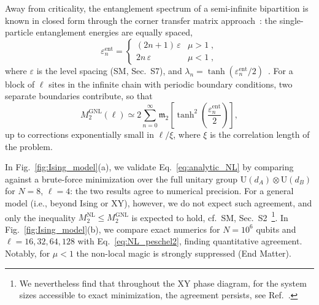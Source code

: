 \documentclass[aps,prl,twocolumn,superscriptaddress,reprint,longbibliography,nofootinbib]{revtex4-2}
\begin{document}
Away from criticality, the entanglement spectrum of a semi-infinite bipartition is known in closed form through the corner transfer matrix approach~\cite{Peschel2009,Eisler2017}: the single-particle entanglement energies are equally spaced,
\begin{equation}
    \varepsilon_n^{\mathrm{ent}} = \begin{cases}
        (2n+1)\,\varepsilon & \mu > 1 \;,\\
        2n\,\varepsilon & \mu < 1 \;,
    \end{cases}
    \label{eq:peschel_spectrum}
\end{equation}
where $\varepsilon$ is the level spacing (SM, Sec.~S7), and $\lambda_n = \tanh(\varepsilon_n^{\mathrm{ent}}/2)$~\cite{Peschel2004}.
For a block of $\ell$ sites in the infinite chain with periodic boundary conditions, two separate boundaries contribute, so that
\begin{equation}
    M_2^{\mathrm{GNL}}(\ell) \simeq 2\sum_{n=0}^{\infty} \mathfrak{m}_2\!\left[\tanh^2\left(\frac{\varepsilon_n^{\mathrm{ent}}}{2}\right)\right],
    \label{eq:NL_peschel2}
\end{equation}
up to corrections exponentially small in $\ell/\xi$, where $\xi$ is the correlation length of the problem.

In Fig.~\ref{fig:Ising_model}(a), we validate Eq.~\eqref{eq:analytic_NL} by comparing against a brute-force minimization over the full unitary group $\mathrm{U}(d_A)\otimes\mathrm{U}(d_B)$ for $N=8$, $\ell=4$: the two results agree to numerical precision. For a general model (i.e., beyond Ising or XY), however, we do not expect such agreement, and only the inequality
$M_2^{\mathrm{NL}}\le M_2^{\mathrm{GNL}}$ is expected to hold,
cf.~SM, Sec.~S2~\footnote{We nevertheless find that throughout the XY phase
diagram, for the system sizes accessible to exact minimization, the agreement persists, see Ref.~\cite{zenodo}.}.
In Fig.~\ref{fig:Ising_model}(b), we compare exact numerics for $N=10^6$ qubits and $\ell = 16,32,64,128$ with Eq.~\eqref{eq:NL_peschel2}, finding quantitative agreement. Notably, for $\mu<1$ the non-local magic is strongly suppressed (End Matter).
\end{document}
